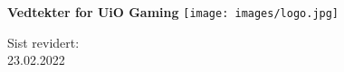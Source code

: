 \begin{titlepage}
\begin{center}
    \vspace*{1cm}

    \Huge
    \textbf{Vedtekter for UiO Gaming}
    \vspace{1cm}
    \vspace{3cm}
    \texttt{[image: images/logo.jpg]}
    \vspace{7cm}

    \LARGE
    Sist revidert:\\
    23.02.2022
\end{center}
\end{titlepage}